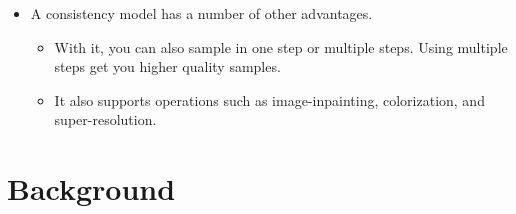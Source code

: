\documentclass[10pt]{article}
\begin{document}
\begin{itemize}
  \item A consistency model has a number of other advantages.
  \begin{itemize}
    \item With it, you can also sample in one step or multiple steps. Using multiple steps get you higher quality samples.
    
    \item It also supports operations such as image-inpainting, colorization, and super-resolution.
  \end{itemize}
\end{itemize}

\section{Background}
\end{document}
